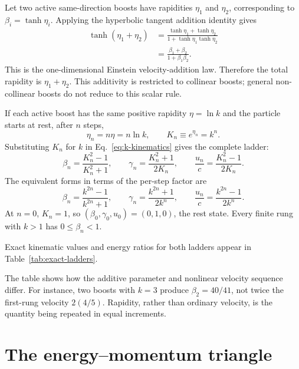 \documentclass[12pt]{article}
\begin{document}
Let two active same-direction boosts have rapidities $\eta_1$ and $\eta_2$, corresponding to $\beta_i=\tanh\eta_i$. Applying the hyperbolic tangent addition identity gives
\begin{align}
  \tanh(\eta_1+\eta_2)
  &=\frac{\tanh\eta_1+\tanh\eta_2}
          {1+\tanh\eta_1\tanh\eta_2} \\
  &=\frac{\beta_1+\beta_2}{1+\beta_1\beta_2}.
  \label{eq:rapidity-composition}
\end{align}
This is the one-dimensional Einstein velocity-addition law. Therefore the total rapidity is $\eta_1+\eta_2$. This additivity is restricted to collinear boosts; general non-collinear boosts do not reduce to this scalar rule.

If each active boost has the same positive rapidity $\eta=\ln k$ and the particle starts at rest, after $n$ steps,
\begin{equation}
  \eta_n=n\eta=n\ln k,
  \qquad
  K_n\equiv e^{\eta_n}=k^n.
  \label{eq:accumulated-squeeze}
\end{equation}
Substituting $K_n$ for $k$ in Eq.~\eqref{eq:k-kinematics} gives the complete ladder:
\begin{equation}
  \beta_n=\frac{K_n^2-1}{K_n^2+1},
  \qquad
  \gamma_n=\frac{K_n^2+1}{2K_n},
  \qquad
  \frac{u_n}{c}=\frac{K_n^2-1}{2K_n}.
  \label{eq:ladder-general}
\end{equation}
The equivalent forms in terms of the per-step factor are
\begin{equation}
  \beta_n=\frac{k^{2n}-1}{k^{2n}+1},
  \qquad
  \gamma_n=\frac{k^{2n}+1}{2k^n},
  \qquad
  \frac{u_n}{c}=\frac{k^{2n}-1}{2k^n}.
  \label{eq:ladder-k-n}
\end{equation}
At $n=0$, $K_n=1$, so $(\beta_0,\gamma_0,u_0)=(0,1,0)$, the rest state. Every finite rung with $k>1$ has $0\leq\beta_n<1$.

Exact kinematic values and energy ratios for both ladders appear in Table~\ref{tab:exact-ladders}.

The table shows how the additive parameter and nonlinear velocity sequence differ. For instance, two boosts with $k=3$ produce $\beta_2=40/41$, not twice the first-rung velocity $2(4/5)$. Rapidity, rather than ordinary velocity, is the quantity being repeated in equal increments.

\section{The energy--momentum triangle}
\label{sec:triangle}
\end{document}
